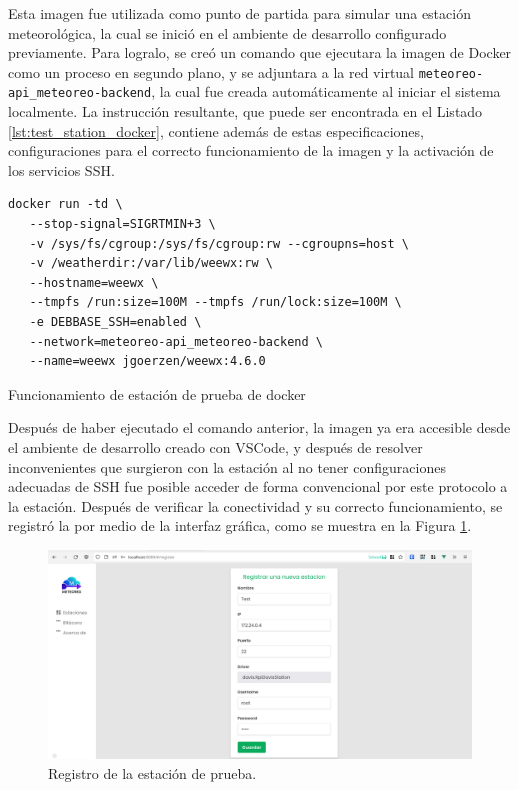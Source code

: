 Esta imagen fue utilizada como punto de partida para simular una estación meteorológica, la cual se inició en el ambiente de desarrollo configurado previamente. Para logralo, se creó un comando que ejecutara la imagen de Docker como un proceso en segundo plano, y se adjuntara a la red virtual \texttt{meteoreo-api\_meteoreo-backend}, la cual fue creada automáticamente al iniciar el sistema localmente. La instrucción resultante, que puede ser encontrada en el Listado \ref{lst:test_station_docker}, contiene además de estas especificaciones, configuraciones para el correcto funcionamiento de la imagen y la activación de los servicios SSH.

\begin{listing}
\begin{verbatim}
docker run -td \
   --stop-signal=SIGRTMIN+3 \
   -v /sys/fs/cgroup:/sys/fs/cgroup:rw --cgroupns=host \
   -v /weatherdir:/var/lib/weewx:rw \
   --hostname=weewx \
   --tmpfs /run:size=100M --tmpfs /run/lock:size=100M \
   -e DEBBASE_SSH=enabled \
   --network=meteoreo-api_meteoreo-backend \
   --name=weewx jgoerzen/weewx:4.6.0
\end{verbatim}
\caption{Funcionamiento de estación de prueba de docker}
\label{lst:test_station_docker}
\end{listing}

Después de haber ejecutado el comando anterior, la imagen ya era accesible desde el ambiente de desarrollo creado con VSCode, y después de resolver inconvenientes que surgieron con la estación al no tener configuraciones adecuadas de SSH fue posible acceder de forma convencional por este protocolo a la estación. Después de verificar la conectividad y su correcto funcionamiento, se registró la por medio de la interfaz gráfica, como se muestra en la Figura \ref{fig:test-station-register}.

\begin{figure}[!ht]
	\centering
	\includegraphics[width=1\linewidth]{images/screenshots/0.1.1-test_station_register.png}
	\caption{Registro de la estación de prueba.}
	\label{fig:test-station-register}
\end{figure}

